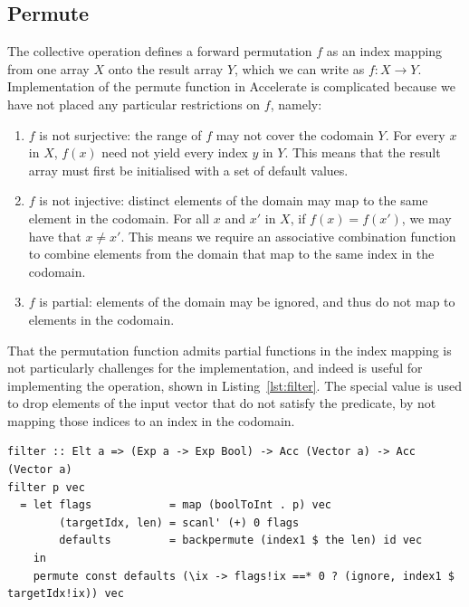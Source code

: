 \subsection{Permute}

The  collective operation defines a forward permutation $f$ as an
index mapping from one array $X$ onto the result array $Y$, which we can write
as  $f : X \rightarrow Y$. Implementation of the permute function in Accelerate
is complicated because we have not placed any particular restrictions on $f$,
namely:
%
\begin{enumerate}
    \item $f$ is not surjective: the range of $f$ may not cover the codomain
        $Y$. For every $x$ in $X$, $f\left( x \right)$ need not yield every
        index $y$ in $Y$. This means that the result array must first be
        initialised with a set of default values.

    \item $f$ is not injective: distinct elements of the domain may
        map to the same element in the codomain. For all $x$ and $x'$ in $X$, if
        $f\left( x \right) = f\left( x' \right)$, we may have that $x \ne x'$.
        This means we require an associative combination function to combine
        elements from the domain that map to the same index in the codomain.

    \item $f$ is partial: elements of the domain may be ignored, and thus do
        not map to elements in the codomain.
\end{enumerate}

That the permutation function admits partial functions in the index mapping is
not particularly challenges for the implementation, and indeed is useful for
implementing the  operation, shown in Listing~\ref{lst:filter}. The
special value  is used to drop elements of the input vector that do
not satisfy the predicate, by not mapping those indices to an index in the
codomain.
%
\begin{lstlisting}[style=haskell
    ,label=lst:filter
    ,caption={[Filter in Accelerate] Filtering returns only those elements of a
    vector which satisfy a predicate. This operation is included as part of
    Accelerate's standard prelude.}]
filter :: Elt a => (Exp a -> Exp Bool) -> Acc (Vector a) -> Acc (Vector a)
filter p vec
  = let flags            = map (boolToInt . p) vec
        (targetIdx, len) = scanl' (+) 0 flags
        defaults         = backpermute (index1 $ the len) id vec
    in
    permute const defaults (\ix -> flags!ix ==* 0 ? (ignore, index1 $ targetIdx!ix)) vec
\end{lstlisting}

